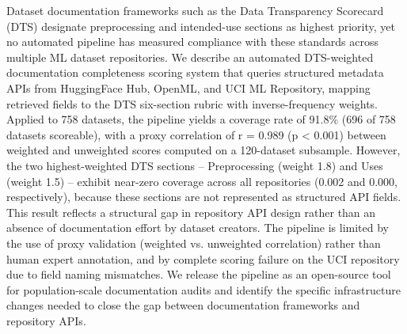 
Dataset documentation frameworks such as the Data Transparency Scorecard (DTS) designate preprocessing and intended-use sections as highest priority, yet no automated pipeline has measured compliance with these standards across multiple ML dataset repositories. We describe an automated DTS-weighted documentation completeness scoring system that queries structured metadata APIs from HuggingFace Hub, OpenML, and UCI ML Repository, mapping retrieved fields to the DTS six-section rubric with inverse-frequency weights. Applied to 758 datasets, the pipeline yields a coverage rate of 91.8\% (696 of 758 datasets scoreable), with a proxy correlation of r = 0.989 (p < 0.001) between weighted and unweighted scores computed on a 120-dataset subsample. However, the two highest-weighted DTS sections -- Preprocessing (weight 1.8) and Uses (weight 1.5) -- exhibit near-zero coverage across all repositories (0.002 and 0.000, respectively), because these sections are not represented as structured API fields. This result reflects a structural gap in repository API design rather than an absence of documentation effort by dataset creators. The pipeline is limited by the use of proxy validation (weighted vs. unweighted correlation) rather than human expert annotation, and by complete scoring failure on the UCI repository due to field naming mismatches. We release the pipeline as an open-source tool for population-scale documentation audits and identify the specific infrastructure changes needed to close the gap between documentation frameworks and repository APIs.
